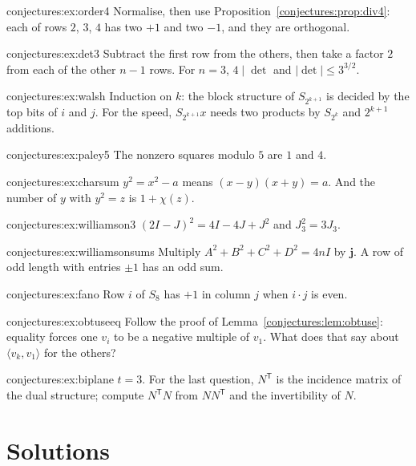 \begin{hint}{conjectures:ex:order4}
Normalise, then use Proposition~\ref{conjectures:prop:div4}: each of rows $2$, $3$, $4$ has two $+1$ and two $-1$, and they are orthogonal.
\end{hint}
\begin{hint}{conjectures:ex:det3}
Subtract the first row from the others, then take a factor $2$ from each of the other $n-1$ rows. For $n=3$, $4\mid\det$ and $|\det|\le3^{3/2}$.
\end{hint}
\begin{hint}{conjectures:ex:walsh}
Induction on $k$: the block structure of $S_{2^{k+1}}$ is decided by the top bits of $i$ and $j$. For the speed, $S_{2^{k+1}}x$ needs two products by
$S_{2^k}$ and $2^{k+1}$ additions.
\end{hint}
\begin{hint}{conjectures:ex:paley5}
The nonzero squares modulo $5$ are $1$ and $4$.
\end{hint}
\begin{hint}{conjectures:ex:charsum}
$y^2=x^2-a$ means $(x-y)(x+y)=a$. And the number of $y$ with $y^2=z$ is $1+\chi(z)$.
\end{hint}
\begin{hint}{conjectures:ex:williamson3}
$(2I-J)^2=4I-4J+J^2$ and $J_3^2=3J_3$.
\end{hint}
\begin{hint}{conjectures:ex:williamsonsums}
Multiply $A^2+B^2+C^2+D^2=4nI$ by $\mathbf j$. A row of odd length with entries $\pm1$ has an odd sum.
\end{hint}
\begin{hint}{conjectures:ex:fano}
Row $i$ of $S_8$ has $+1$ in column $j$ when $i\cdot j$ is even.
\end{hint}
\begin{hint}{conjectures:ex:obtuseeq}
Follow the proof of Lemma~\ref{conjectures:lem:obtuse}: equality forces one $v_i$ to be a negative multiple of $v_1$. What does that say about $\langle v_k,v_1\rangle$
for the others?
\end{hint}
\begin{hint}{conjectures:ex:biplane}
$t=3$. For the last question, $N^{\mathsf T}$ is the incidence matrix of the dual structure; compute $N^{\mathsf T}N$ from $NN^{\mathsf T}$ and the
invertibility of $N$.
\end{hint}

\section{Solutions}

